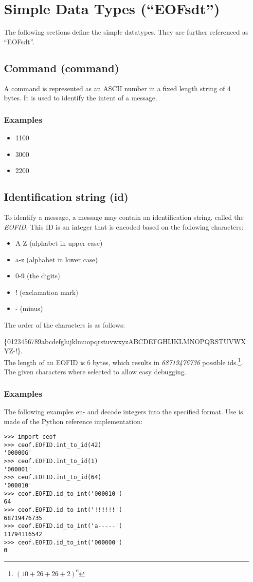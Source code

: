 \section{Simple Data Types ("`EOFsdt"')}
The following sections define the simple datatypes.
They are further referenced as "`EOFsdt"'.
\subsection{Command (command)}
A command is represented as an ASCII number in a fixed length string of
4 bytes. It is used to identify the intent of a message.
\subsubsection{Examples}
\begin{itemize}
\item 1100
\item 3000
\item 2200
\end{itemize}
\subsection{Identification string (id)}
\label{eofid}
To identify a message, a message may contain an identification string,
called the \textit{EOFID}.
This ID is an integer that is encoded based on the following characters:
\begin{itemize}
\item A-Z (alphabet in upper case)
\item a-z (alphabet in lower case)
\item 0-9 (the digits)
\item ! (exclamation mark)
\item - (minus)
\end{itemize}
The order of the characters is as follows:

\small{\{0123456789abcdefghijklmnopqrstuvwxyzABCDEFGHIJKLMNOPQRSTUVWXYZ-!\}}.\\
The length of an EOFID is 6 bytes, which results in
\emph{68719476736} possible ids.\footnote{$(10+26+26+2)^6$}.
The given characters where selected to allow easy debugging.
\subsubsection{Examples}
The following examples en- and decode integers into the specified format.
Use is made of the Python reference implementation:
\begin{verbatim}
>>> import ceof
>>> ceof.EOFID.int_to_id(42)
'00000G'
>>> ceof.EOFID.int_to_id(1)
'000001'
>>> ceof.EOFID.int_to_id(64)
'000010'
>>> ceof.EOFID.id_to_int('000010')
64
>>> ceof.EOFID.id_to_int('!!!!!!')
68719476735
>>> ceof.EOFID.id_to_int('a-----')
11794116542
>>> ceof.EOFID.id_to_int('000000')
0
\end{verbatim}
